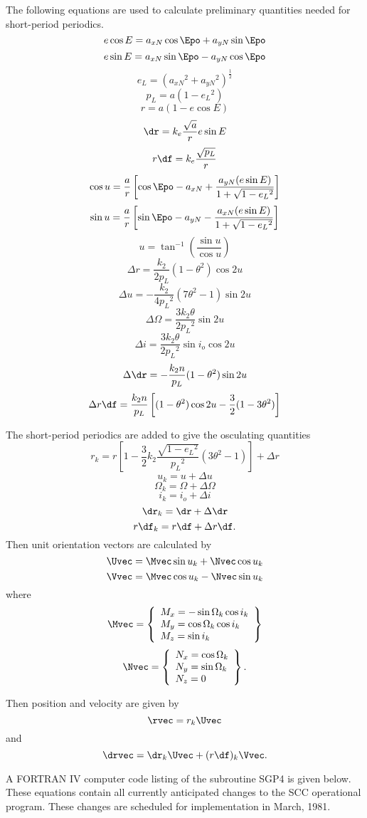 The following equations are used to calculate preliminary quantities needed
for short-period periodics.
\[e\cos E=a_{xN}\cos\Epo+a_{yN}\sin\Epo\]
\[e\sin E=a_{xN}\sin\Epo-a_{yN}\cos\Epo\]
\[e_L=(a_{xN}{}^2+a_{yN}{}^2)^{\frac12}\]
\[p_L=a(1-e_L{}^2)\]
\[r=a(1-e\cos E)\]
\[\dr=k_e\dfrac{\sqrt{a}}re\sin E\]
\[r\df=k_e\dfrac{\sqrt{p_L}}r\]
\[\cos u=\dfrac{a}r\left[\cos\Epo-a_{xN}+
\dfrac{a_{yN}(e\sin E)}{1+\sqrt{1-e_L{}^2}}\right]\]
\[\sin u=\dfrac{a}r\left[\sin\Epo-a_{yN}-
\dfrac{a_{xN}(e\sin E)}{1+\sqrt{1-e_L{}^2}}\right]\]
\[u=\tan^{-1}\left(\dfrac{\sin u}{\cos u}\right)\]
\[\Delta r=\dfrac{k_2}{2p_L}(1-\theta^2)\cos 2u\]
\[\Delta u=-\dfrac{k_2}{4p_L{}^2}(7\theta^2-1)\sin 2u\]
\[\Delta\Omega=\dfrac{3k_2\theta}{2p_L{}^2}\sin 2u\]
\[\Delta i=\dfrac{3k_2\theta}{2p_L{}^2}\sin i_o\cos 2u\]
\[\Delta\dr=-\dfrac{k_2n}{p_L}(1-\theta^2)\sin 2u\]
\[\Delta r\df=\dfrac{k_2n}{p_L}\left[(1-\theta^2)\cos 2u-\dfrac32(1-3
\theta^2)\right]\]

The short-period periodics are added to give the osculating quantities
\[r_k=r\left[1-\dfrac32k_2\dfrac{\sqrt{1-e_L{}^2}}{p_L{}^2}(3\theta^2-1)\right]
+\Delta r\]
\[u_k=u+\Delta u\]
\[\Omega_k=\Omega+\Delta\Omega\]
\[i_k=i_o+\Delta i\]
\[\dr_k=\dr+\Delta\dr\]
\[r\df_k=r\df+\Delta r\df.\]
Then unit orientation vectors are calculated by
\[\Uvec=\Mvec\sin u_k+\Nvec\cos u_k\]
\[\Vvec=\Mvec\cos u_k-\Nvec\sin u_k\]
where
\[\Mvec=\left\{\begin{array}{l}
                          M_x=-\sin\Omega_k\cos i_k\\
                          M_y=\cos\Omega_k\cos i_k\\
                          M_z=\sin i_k
                         \end{array}\right\}\]
\[\Nvec=\left\{\begin{array}{l}
                          N_x=\cos\Omega_k\\
                          N_y=\sin\Omega_k\\
                          N_z=0
                         \end{array}\right\}.\]

Then position and velocity are given by
\[\rvec=r_k\Uvec\]
and
\[\drvec=\dr_k\Uvec+(r\df)_k\Vvec.\]

A FORTRAN IV computer code listing of the subroutine SGP4 is given below.
These equations contain all currently anticipated changes to the SCC
operational program.  These changes are scheduled for implementation in March,
1981.
\newpage

\newpage

